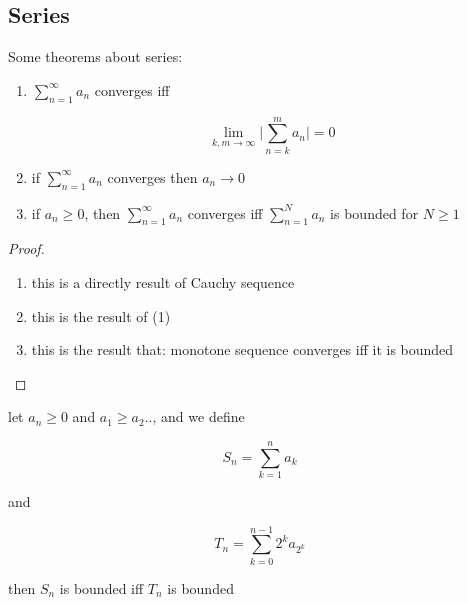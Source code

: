 \subsection{Series}

\begin{thm}
    Some theorems about series:

    \begin{enumerate}
        \item $\sum_{n=1}^{\infty} a_n$ converges iff

        \[
            \lim_{k,m \to \infty} \lvert \sum_{n=k}^{m}a_n \rvert = 0
        \]

        \item if $\sum_{n=1}^{\infty} a_n$ converges then $a_n \to 0$

        \item if $a_n \ge 0$, then $\sum_{n=1}^{\infty} a_n$ converges iff $\sum_{n=1}^{N} a_n$ is bounded for $N \ge 1$
    \end{enumerate}
\end{thm}

\begin{proof}
    \begin{enumerate}
        \item this is a directly result of Cauchy sequence

        \item this is the result of (1)

        \item this is the result that: monotone sequence converges iff it is bounded
    \end{enumerate}
\end{proof}

\begin{thm}
    \label{thm:3-3-2}
    let $a_n \ge 0 $ and $a_1 \ge a_2 ..$, and we define

    \[
        S_n = \sum_{k=1}^{n}a_k
    \]

    and

    \[
        T_n = \sum_{k=0}^{n-1}2^ka_{2^k}
    \]

    then $S_n$ is bounded iff $T_n$ is bounded

\end{thm}

